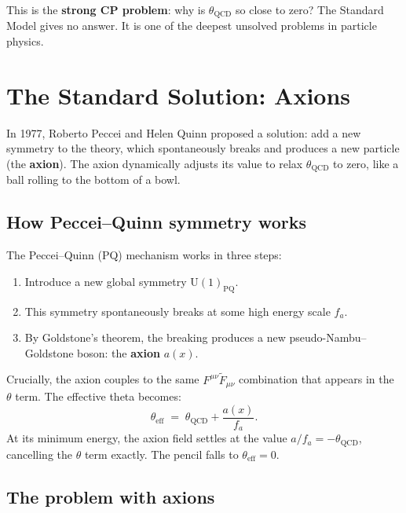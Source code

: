 \documentclass[11pt,a4paper]{article}
\newcommand{\term}[1]{\textbf{#1}}
\begin{document}
This is the \term{strong CP problem}: why is $\theta_{\mathrm{QCD}}$ so close to zero?  The Standard Model gives no answer.  It is one of the deepest unsolved problems in particle physics.

\section{The Standard Solution: Axions}

\begin{tcolorbox}[colback=boxblue,colframe=blue!40!black,title=The axion idea]
In 1977, Roberto Peccei and Helen Quinn proposed a solution: add a new symmetry to the theory, which spontaneously breaks and produces a new particle (the \term{axion}).  The axion dynamically adjusts its value to relax $\theta_{\mathrm{QCD}}$ to zero, like a ball rolling to the bottom of a bowl.
\end{tcolorbox}

\subsection{How Peccei--Quinn symmetry works}

The Peccei--Quinn (PQ) mechanism works in three steps:
\begin{enumerate}
  \item Introduce a new global symmetry $\mathrm{U}(1)_{\mathrm{PQ}}$.
  \item This symmetry spontaneously breaks at some high energy scale $f_a$.
  \item By Goldstone's theorem, the breaking produces a new pseudo-Nambu--Goldstone boson: the \term{axion} $a(x)$.
\end{enumerate}

Crucially, the axion couples to the same $F^{\mu\nu}\tilde{F}_{\mu\nu}$ combination that appears in the $\theta$ term.  The effective theta becomes:
\[
  \theta_{\mathrm{eff}} \;=\; \theta_{\mathrm{QCD}} + \frac{a(x)}{f_a}.
\]
At its minimum energy, the axion field settles at the value $a/f_a = -\theta_{\mathrm{QCD}}$, cancelling the $\theta$ term exactly.  The pencil falls to $\theta_{\mathrm{eff}} = 0$.

\subsection{The problem with axions}
\end{document}
